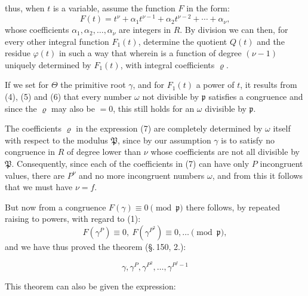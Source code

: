 thus, when $t$ is a variable, assume the function $F$ in the form:
\[
F(t) = t^\nu + \alpha_1 t^{\nu-1} + \alpha_2 t^{\nu-2} + \cdots + \alpha_\nu,
\]
whose coefficients $\alpha_1, \alpha_2, \ldots, \alpha_\nu$ are integers in $R$. By division we can then, for every other integral function $F_1(t)$, determine the quotient $Q(t)$ and the residue $\varphi(t)$ in such a way that
wherein
is a function of degree $(\nu-1)$ uniquely determined by $F_1(t)$, with integral coefficients $\varrho$.

If we set for $\Theta$ the primitive root $\gamma$, and for $F_1(t)$ a power of $t$, it results from (4), (5) and (6) that every number $\omega$ not divisible by $\mathfrak{p}$ satisfies a congruence
and since the $\varrho$ may also be $= 0$, this still holds for an $\omega$ divisible by $\mathfrak{p}$.

The coefficients $\varrho$ in the expression (7) are completely determined by $\omega$ itself with respect to the modulus $\mathfrak{P}$, since by our assumption $\gamma$ is to satisfy no congruence in $R$ of degree lower than $\nu$ whose coefficients are not all divisible by $\mathfrak{P}$. Consequently, since each of the coefficients in (7) can have only $P$ incongruent values, there are $P^\nu$ and no more incongruent numbers $\omega$, and from this it follows that we must have $\nu = f$.

But now from a congruence $F(\gamma) \equiv 0 \pmod{\mathfrak{p}}$ there follows, by repeated raising to powers, with regard to (1):
\[
F(\gamma^P) \equiv 0, \ F(\gamma^{P^2}) \equiv 0, \ldots \pmod{\mathfrak{p}},
\]
and we have thus proved the theorem (\S.\,150, 2.):

\[
\gamma, \gamma^P, \gamma^{P^2}, \ldots, \gamma^{P^f-1}
\]

This theorem can also be given the expression:

